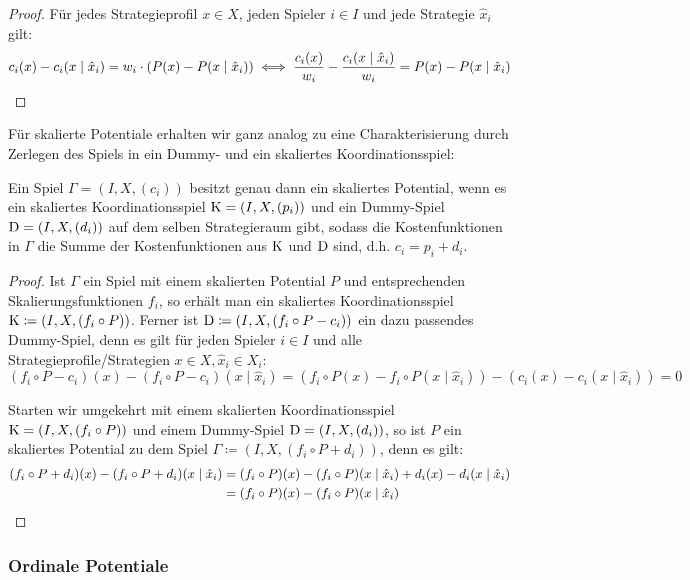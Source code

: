\begin{proof}
	Für jedes Strategieprofil $x \in X$, jeden Spieler $i \in I$ und jede Strategie $\hat{x}_i$ gilt:
		\[c_i(x) - c_i(x \mid \hat{x}_i) = w_i\cdot(P(x) - P(x \mid \hat{x}_i)) \iff \frac{c_i(x)}{w_i} - \frac{c_i(x \mid \hat{x}_i)}{w_i} = P(x) - P(x \mid \hat{x}_i) \qedhere\]
\end{proof}

Für skalierte Potentiale erhalten wir ganz analog zu  eine Charakterisierung durch Zerlegen des Spiels in ein Dummy- und ein skaliertes Koordinationsspiel:

\begin{satz}\label{satz:CharSkalPot}
	Ein Spiel $\Gamma = (I, X, (c_i))$ besitzt genau dann ein skaliertes Potential, wenn es ein skaliertes Koordinationsspiel $\mathrm{K} = (I, X, (p_i))$ und ein Dummy-Spiel $\mathrm{D} = (I, X, (d_i))$ auf dem selben Strategieraum gibt, sodass die Kostenfunktionen in $\Gamma$ die Summe der Kostenfunktionen aus $\mathrm{K}$ und $\mathrm{D}$ sind, d.h. $c_i = p_i + d_i$.
\end{satz}

\begin{proof}
	Ist $\Gamma$ ein Spiel mit einem skalierten Potential $P$ und entsprechenden Skalierungsfunktionen $f_i$, so erhält man ein skaliertes Koordinationsspiel $\mathrm{K} \coloneqq (I, X, (f_i \circ P))$. Ferner ist $\mathrm{D} \coloneqq (I, X, (f_i\circ P-c_i))$ ein dazu passendes Dummy-Spiel, denn es gilt für jeden Spieler $i \in I$ und alle Strategieprofile/Strategien $x \in X, \hat{x}_i \in X_i$:
	\[(f_i\circ P-c_i)(x) - (f_i\circ P-c_i)(x \mid \hat{x}_i) = \left(f_i\circ P(x) - f_i\circ P(x \mid \hat{x}_i)\right) - \left(c_i(x) - c_i(x \mid \hat{x}_i)\right) = 0 \]
	
	Starten wir umgekehrt mit einem skalierten Koordinationsspiel $\mathrm{K} = (I, X, (f_i \circ P))$ und einem Dummy-Spiel $\mathrm{D} = (I, X, (d_i))$, so ist $P$ ein skaliertes Potential zu dem Spiel $\Gamma \coloneqq (I, X, (f_i\circ P + d_i))$, denn es gilt:
		\begin{align*}
			(f_i\circ P + d_i)(x) - (f_i\circ P + d_i)(x \mid \hat{x}_i) &= (f_i\circ P)(x) - (f_i\circ P)(x \mid \hat{x}_i) + d_i(x) - d_i(x \mid \hat{x}_i) \\
				&= (f_i\circ P)(x) - (f_i\circ P)(x \mid \hat{x}_i) \qedhere
		\end{align*}
\end{proof}


\subsubsection{Ordinale Potentiale}

